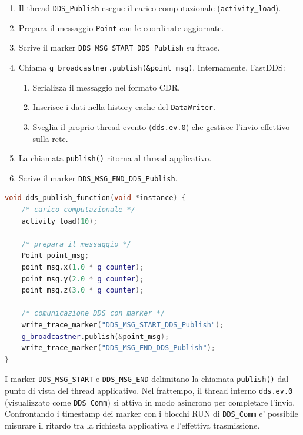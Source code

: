 \begin{enumerate}
    \item Il thread \texttt{DDS\_Publish} esegue il carico computazionale
          (\texttt{activity\_load}).
    \item Prepara il messaggio \texttt{Point} con le coordinate aggiornate.
    \item Scrive il marker \texttt{DDS\_MSG\_START\_DDS\_Publish} su ftrace.
    \item Chiama \texttt{g\_broadcastner.publish(\&point\_msg)}.
          Internamente, FastDDS:
          \begin{enumerate}
              \item Serializza il messaggio nel formato CDR.
              \item Inserisce i dati nella history cache del \texttt{DataWriter}.
              \item Sveglia il proprio thread evento (\texttt{dds.ev.0})
                    che gestisce l'invio effettivo sulla rete.
          \end{enumerate}
    \item La chiamata \texttt{publish()} ritorna al thread applicativo.
    \item Scrive il marker \texttt{DDS\_MSG\_END\_DDS\_Publish}.
\end{enumerate}

\begin{lstlisting}[language=C++, caption={Funzione del task periodico DDS\_Publish.}, label={lst:publish_func}]
void dds_publish_function(void *instance) {
    /* carico computazionale */
    activity_load(10);

    /* prepara il messaggio */
    Point point_msg;
    point_msg.x(1.0 * g_counter);
    point_msg.y(2.0 * g_counter);
    point_msg.z(3.0 * g_counter);

    /* comunicazione DDS con marker */
    write_trace_marker("DDS_MSG_START_DDS_Publish");
    g_broadcastner.publish(&point_msg);
    write_trace_marker("DDS_MSG_END_DDS_Publish");
}
\end{lstlisting}

I marker \texttt{DDS\_MSG\_START} e \texttt{DDS\_MSG\_END} delimitano
la chiamata \texttt{publish()} dal punto di vista del thread applicativo.
Nel frattempo, il thread interno \texttt{dds.ev.0} (visualizzato come
\texttt{DDS\_Comm}) si attiva in modo asincrono per completare l'invio.
Confrontando i timestamp dei marker con i blocchi RUN di \texttt{DDS\_Comm}
e' possibile misurare il ritardo tra la richiesta applicativa e l'effettiva
trasmissione.


